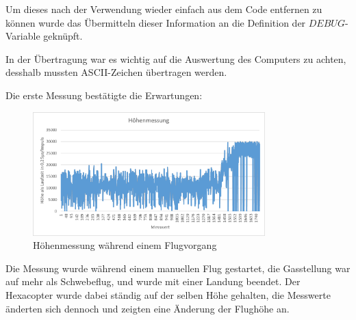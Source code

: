   Um dieses nach der Verwendung wieder einfach aus dem Code entfernen zu können wurde das Übermitteln dieser Information an die Definition der $DEBUG$-Variable geknüpft.

  In der Übertragung war es wichtig auf die Auswertung des Computers zu achten, desshalb mussten ASCII-Zeichen übertragen werden.

  Die erste Messung bestätigte die Erwartungen:
  \begin{figure}[H]
    \begin{centering}
      \includegraphics[width = 0.8\textwidth]{Bilder/Hoehenmessung}
    \par\end{centering}
    \caption{Höhenmessung während einem Flugvorgang}
    \label{Hoehenmessung}
  \end{figure}
  Die Messung wurde während einem manuellen Flug gestartet, die Gasstellung war auf mehr als Schwebeflug, und wurde mit einer Landung beendet. Der Hexacopter wurde dabei ständig
  auf der selben Höhe gehalten, die Messwerte änderten sich dennoch und zeigten eine Änderung der Flughöhe an.

